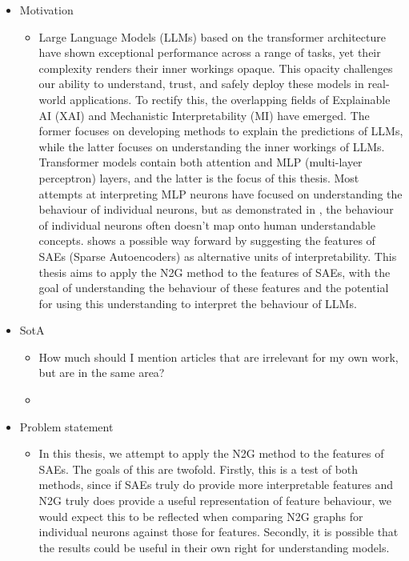 \documentclass[../main.tex]{subfiles}
\begin{document}
\begin{itemize}
    \item Motivation
    \begin{itemize}
        \item Large Language Models (LLMs) based on the transformer architecture \citep{vaswani_attention_2023} have shown exceptional performance across a range of tasks, yet their complexity renders their inner workings opaque.
        This opacity challenges our ability to understand, trust, and safely deploy these models in real-world applications.
        To rectify this, the overlapping fields of Explainable AI (XAI) and Mechanistic Interpretability (MI) have emerged.
        The former focuses on developing methods to explain the predictions of LLMs, while the latter focuses on understanding the inner workings of LLMs.
        Transformer models contain both attention and MLP (multi-layer perceptron) layers, and the latter is the focus of this thesis.
        Most attempts at interpreting MLP neurons have focused on understanding the behaviour of individual neurons, but as demonstrated in \citet{elhage_toy_2022}, the behaviour of individual neurons often doesn't map onto human understandable concepts.
        \citet{bricken_towards_2023} shows a possible way forward by suggesting the features of SAEs (Sparse Autoencoders) as alternative units of interpretability.
        This thesis aims to apply the N2G \citep{foote_neuron_2023} method to the features of SAEs, with the goal of understanding the behaviour of these features and the potential for using this understanding to interpret the behaviour of LLMs.
    \end{itemize}
    \item SotA
    \begin{itemize}
        \item How much should I mention articles that are irrelevant for my own work, but are in the same area?
        \item 
    \end{itemize}
    \item Problem statement
    \begin{itemize}
        \item In this thesis, we attempt to apply the N2G method to the features of SAEs.
        The goals of this are twofold.
        Firstly, this is a test of both methods, since if SAEs truly do provide more interpretable features and N2G truly does provide a useful representation of feature behaviour, we would expect this to be reflected when comparing N2G graphs for individual neurons against those for features. 
        Secondly, it is possible that the results could be useful in their own right for understanding models.
    \end{itemize}
\end{itemize}

\subbib
\end{document}
